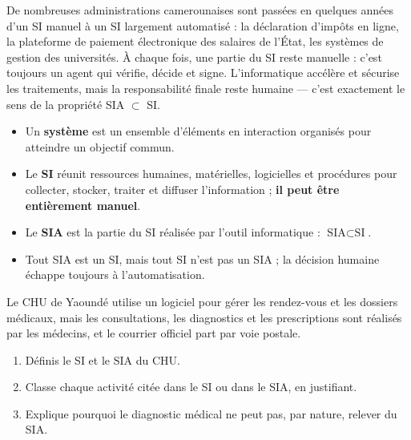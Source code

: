 \documentclass[11pt]{article}
\begin{document}
\begin{savaistu}
De nombreuses administrations camerounaises sont passées en quelques années d'un SI manuel à un SI largement automatisé : la déclaration d'impôts en ligne, la plateforme de paiement électronique des salaires de l'État, les systèmes de gestion des universités. À chaque fois, une partie du SI reste manuelle : c'est toujours un agent qui vérifie, décide et signe. L'informatique accélère et sécurise les traitements, mais la responsabilité finale reste humaine — c'est exactement le sens de la propriété SIA $\subset$ SI.
\end{savaistu}

\begin{aretenir}
\begin{itemize}
  \item Un \textbf{système} est un ensemble d'éléments en interaction organisés pour atteindre un objectif commun.
  \item Le \textbf{SI} réunit ressources humaines, matérielles, logicielles et procédures pour collecter, stocker, traiter et diffuser l'information ; \textbf{il peut être entièrement manuel}.
  \item Le \textbf{SIA} est la partie du SI réalisée par l'outil informatique : $\text{SIA} \subset \text{SI}$.
  \item Tout SIA est un SI, mais tout SI n'est pas un SIA ; la décision humaine échappe toujours à l'automatisation.
\end{itemize}
\end{aretenir}

\begin{exercice}
Le CHU de Yaoundé utilise un logiciel pour gérer les rendez-vous et les dossiers médicaux, mais les consultations, les diagnostics et les prescriptions sont réalisés par les médecins, et le courrier officiel part par voie postale.
\begin{enumerate}
  \item Définis le SI et le SIA du CHU.
  \item Classe chaque activité citée dans le SI ou dans le SIA, en justifiant.
  \item Explique pourquoi le diagnostic médical ne peut pas, par nature, relever du SIA.
\end{enumerate}
\end{exercice}
\end{document}
